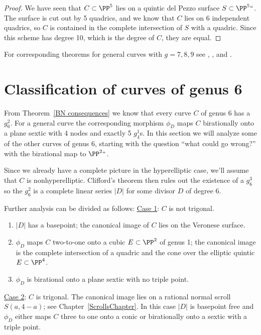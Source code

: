 \begin{proof}
We have seen that $C \subset \PP^5$ lies on a quintic del Pezzo surface
%
$S \subset \PP^5` `$. The surface is cut out by 5 quadrics, and we know
that $C$ lies on 6 independent quadrics,
so $C$ is contained in the complete intersection of $S$ with a
quadric. Since this scheme has degree 10, which is the degree of $C$,
they are equal.
\end{proof}

For corresponding theorems for general curves with $g=7,8,9$ see
\cite{Mukai1}, \cite{Mukai2}, and \cite{Mukai3}.


\section{Classification of curves of genus 6}

From Theorem~\ref{BN consequences} we know that every curve $C$ of genus
6 has  a $g^{2}_{6}$. For a general curve the corresponding morphism
$\phi_{D}$ maps $C$ birationally onto a plane sextic with 4 nodes and
exactly 5 $g^{1}_{4}$s.
In this  section we will analyze some of the other curves of genus 6,
starting with the question  ``what could go wrong?''
with the birational map to $\PP^2` `$.

Since we already have a complete picture in the hyperelliptic case, we'll
assume that $C$ is nonhyperelliptic. Clifford's theorem then rules out
the existence of a $g^3_6$ so  the $g^2_6$ is a complete linear series
$|D|$ for some divisor $D$ of degree 6.

Further analysis can be divided as follows:
\smallbreak
\noindent\underline{Case 1}:
$C$ is not
trigonal.
%
\begin{enumerate}\def\theenumi{\alph{enumi}}
 \item $|D|$ has a basepoint; the canonical image of $C$ lies on the
 Veronese surface.
\item $\phi_{D}$ maps $C$
two-to-one
%
onto a cubic $E \subset \PP^2$ of
genus 1; the canonical image is the
complete intersection
%
of a quadric
and the
cone over the elliptic quintic
%
%
$E\subset \PP^{4}$.
\item $\phi_{D}$ is birational onto a plane sextic with no triple point.
%
 \end{enumerate}
\noindent\underline{Case 2}:
$C$ is trigonal. The canonical image lies on a
rational normal scroll $S(a,4-a)$; see Chapter~\ref{ScrollsChapter}.
In this case $|D|$ is basepoint free and $\phi_{D}$  either maps $C$
three to one onto a conic
 or birationally onto a
sextic with a triple point.
%
%
%
\smallbreak

